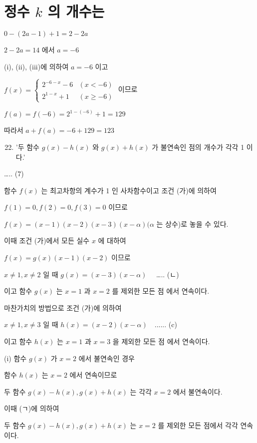 \documentclass[10pt]{article}
\begin{document}
\section*{정수 \(k\) 의 개수는}
\(0-(2 a-1)+1=2-2 a\)

\(2-2 a=14\) 에서 \(a=-6\)

(i), (ii), (iii)에 의하여 \(a=-6\) 이고

\(f(x)=\left\{\begin{array}{ll}2^{-6-x}-6 & (x<-6) \\ 2^{1-x}+1 & (x \geq-6)\end{array}\right.\) 이므로

\(f(a)=f(-6)=2^{1-(-6)}+1=129\)

따라서 \(a+f(a)=-6+129=123\)

\begin{enumerate}
  \setcounter{enumi}{21}
  \item '두 함수 \(g(x)-h(x)\) 와 \(g(x)+h(x)\) 가 불연속인 점의 개수가 각각 1 이다.'
\end{enumerate}

….. (7)

함수 \(f(x)\) 는 최고차항의 계수가 1 인 사차함수이고 조건 (가)에 의하여

\(f(1)=0, f(2)=0, f(3)=0\) 이므로

\(f(x)=(x-1)(x-2)(x-3)(x-\alpha)(\alpha\) 는 상수)로 놓을 수 있다.

이때 조건 (가)에서 모든 실수 \(x\) 에 대하여

\(f(x)=g(x)(x-1)(x-2)\) 이므로

\(x \neq 1, x \neq 2\) 일 때 \(g(x)=(x-3)(x-\alpha) \quad\) ….. (ㄴ)

이고 함수 \(g(x)\) 는 \(x=1\) 과 \(x=2\) 를 제외한 모든 점 에서 연속이다.

마찬가치의 방법으로 조건 (가)에 의하여

\(x \neq 1, x \neq 3\) 일 때 \(h(x)=(x-2)(x-\alpha) \quad\)...... (c)

이고 함수 \(h(x)\) 는 \(x=1\) 과 \(x=3\) 을 제외한 모든 점 에서 연속이다.

(i) 함수 \(g(x)\) 가 \(x=2\) 에서 불연속인 경우

함수 \(h(x)\) 는 \(x=2\) 에서 연속이므로

두 함수 \(g(x)-h(x), g(x)+h(x)\) 는 각각 \(x=2\) 에서 불연속이다.

이때 (ㄱ)에 의하여

두 함수 \(g(x)-h(x), g(x)+h(x)\) 는 \(x=2\) 를 제외한 모든 점에서 각각 연속이다.
\end{document}
